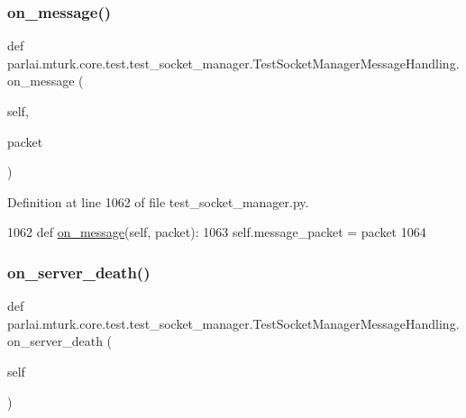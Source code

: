 \subsubsection{\texorpdfstring{on\+\_\+message()}{on\_message()}}
{\footnotesize\ttfamily def parlai.\+mturk.\+core.\+test.\+test\+\_\+socket\+\_\+manager.\+Test\+Socket\+Manager\+Message\+Handling.\+on\+\_\+message (\begin{DoxyParamCaption}\item[{}]{self,  }\item[{}]{packet }\end{DoxyParamCaption})}



Definition at line 1062 of file test\+\_\+socket\+\_\+manager.\+py.


\begin{DoxyCode}
1062     \textcolor{keyword}{def }\hyperlink{namespaceparlai_1_1chat__service_1_1services_1_1browser__chat_1_1client_a01c1536b48e2f5badd2fe58ea02b9a5c}{on\_message}(self, packet):
1063         self.message\_packet = packet
1064 
\end{DoxyCode}
\mbox{\label{classparlai_1_1mturk_1_1core_1_1test_1_1test__socket__manager_1_1TestSocketManagerMessageHandling_a6550815e562fabf489e4aacf809d8650}} 
\subsubsection{\texorpdfstring{on\+\_\+server\+\_\+death()}{on\_server\_death()}}
{\footnotesize\ttfamily def parlai.\+mturk.\+core.\+test.\+test\+\_\+socket\+\_\+manager.\+Test\+Socket\+Manager\+Message\+Handling.\+on\+\_\+server\+\_\+death (\begin{DoxyParamCaption}\item[{}]{self }\end{DoxyParamCaption})}




